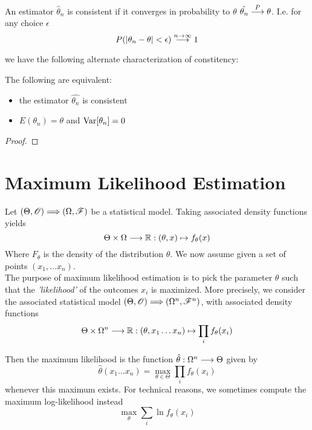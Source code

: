 \begin{definition}
An estimator $\hat{\theta}_n$ is consistent if it converges in probability to $\theta$ $\hat{\theta_n}\stackrel{P}{\longrightarrow} \theta$. I.e. for any choice $\epsilon$
\[
P(\vert \theta_n-\theta\vert <\epsilon)\stackrel{n\to \infty}{\longrightarrow} 1
\]
\end{definition}

we have the following alternate characterization of constitency:

\begin{lemma}
The following are equivalent:
\begin{itemize}
\item the estimator $\hat{\theta_n}$ is consistent
\item $E(\theta_n)=\theta$ and $\operatorname{Var}[\theta_n]=0$	
\end{itemize}
\end{lemma}

\begin{proof}
	
\end{proof}
 
 
\section{Maximum Likelihood Estimation}
Let $(\Theta, \r{O})\Longrightarrow (\Omega, \r{F})$ be a statistical model. Taking associated density functions yields
\[
\Theta\times \Omega \longrightarrow \mathbb{R}:(\theta,x)\mapsto f_\theta(x)
\]
Where $F_\theta$ is the density of the distribution $\theta$. We now assume given a set of points $(x_1,\ldots x_n)$.\\ The purpose of maximum likelihood estimation is to pick the parameter $\theta$ such that the \emph{'likelihood'} of the outcomes $x_i$ is maximized. More precisely, we consider the associated statistical model $(\Theta,\r{O})\Longrightarrow (\Omega^n,\r{F}^n)$, with associated density functions
\[
\Theta\times \Omega^n\longrightarrow \mathbb{R}:(\theta,x_1\ldots x_n)\mapsto \prod_i f_\theta(x_i)
\]


Then the maximum likelihood is the function $\hat{\theta}:\Omega^n\longrightarrow \Theta$ given by
\[
\hat{\theta}(x_1\ldots x_n)=\max_{\theta\in \Theta} \prod_i f_\theta(x_i)
\]
whenever this maximum exists. For technical reasons, we sometimes compute the maximum  log-likelihood instead
\[
\max_\theta \sum_i \ln f_\theta(x_i)
\]

